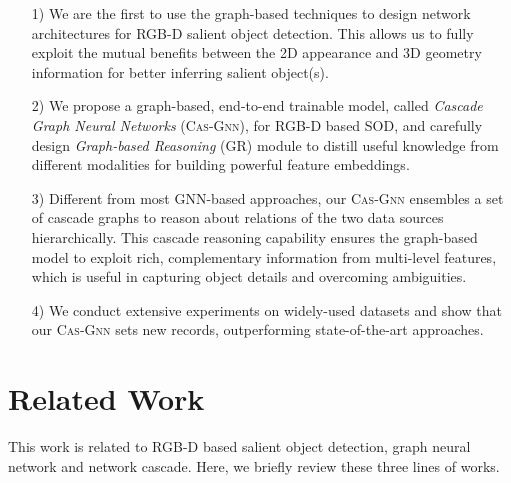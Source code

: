 \documentclass[runningheads]{llncs}
\begin{document}
\begin{enumerate}
	\item[1)] We are the first to use the graph-based techniques to design network architectures for RGB-D salient object detection. This allows us to fully exploit the mutual benefits between the 2D appearance and 3D geometry information for better inferring salient object(s). 
	
	


	\item[2)] We propose a graph-based, end-to-end trainable model, called {\em Cascade Graph Neural Networks} ({\scshape{Cas-Gnn}}), for RGB-D based SOD, and carefully design {\em Graph-based Reasoning} (GR) module to distill useful knowledge from different modalities for building powerful feature embeddings. 
	
	
	


	
	\item[3)] Different from most GNN-based approaches, our {\scshape{Cas-Gnn}} ensembles a set of cascade graphs to reason about relations of the two data sources hierarchically. This cascade reasoning capability ensures the graph-based model to exploit rich, complementary information from multi-level features, which is useful in capturing object details and overcoming ambiguities.
	
	
	\item[4)] We conduct extensive experiments on  widely-used datasets and show that our {\scshape{Cas-Gnn}} sets new records, outperforming state-of-the-art approaches.  
	
	
\end{enumerate}	

	\section{Related Work}
		This work is related to RGB-D based salient object detection, graph neural network and network cascade. Here, we briefly review these three lines of works.
		
\end{document}
